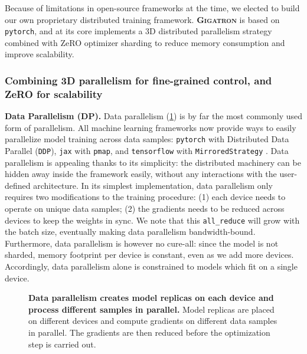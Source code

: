 \documentclass{article}
\DeclareRobustCommand{\hardware}[1]{\textcolor{Mahogany}{#1}}
\begin{document}
Because of limitations in open-source frameworks at the time, we elected to build our own proprietary distributed training framework. \textsc{\textbf{\hardware{Gigatron}}} is based on \texttt{pytorch}, and at its core implements a 3D distributed parallelism strategy \citep{megatron-1, megatron-2} combined with ZeRO optimizer sharding \citep{zero-msft} to reduce memory consumption and improve scalability.


\subsubsection{Combining 3D parallelism for fine-grained control, and ZeRO for scalability}

\textbf{Data Parallelism (DP).} Data parallelism (\cref{fig:dp}) is by far the most commonly used form of parallelism. All machine learning frameworks now provide ways to easily parallelize model training across data samples: \texttt{pytorch} with Distributed Data Parallel (\texttt{DDP}), \texttt{jax} with \texttt{pmap}, and \texttt{tensorflow} with \texttt{MirroredStrategy} \citep{pytorch, jax, tensorflow}. Data parallelism is appealing thanks to its simplicity: the distributed machinery can be hidden away inside the framework easily, without any interactions with the user-defined architecture. In its simplest implementation, data parallelism only requires two modifications to the training procedure: (1) each device needs to operate on unique data samples; (2) the gradients needs to be reduced across devices to keep the weights in sync. We note that this \texttt{all\_reduce} will grow with the batch size, eventually making data parallelism bandwidth-bound. Furthermore, data parallelism is however no cure-all: since the model is not sharded, memory footprint per device is constant, even as we add more devices. Accordingly, data parallelism alone is constrained to models which fit on a single device.

\begin{figure}[b]
    \centering
    \vspace{-0.2in}
    
    \caption{\textbf{\hardware{Data parallelism creates model replicas on each device and process different samples in parallel.}} Model replicas are placed on different devices and compute gradients on different data samples in parallel. The gradients are then reduced before the optimization step is carried out.}
    \label{fig:dp}
\end{figure}
\end{document}
